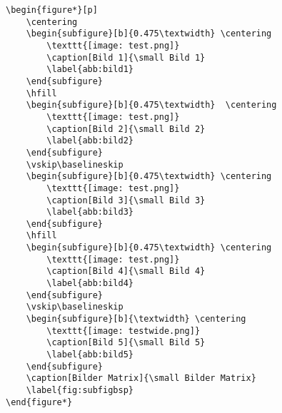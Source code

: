 \clearpage
\begin{lstlisting}[style=latex]
\begin{figure*}[p]
	\centering
	\begin{subfigure}[b]{0.475\textwidth} \centering
		\texttt{[image: test.png]}
		\caption[Bild 1]{\small Bild 1}
		\label{abb:bild1}
	\end{subfigure}
	\hfill
	\begin{subfigure}[b]{0.475\textwidth}  \centering 
		\texttt{[image: test.png]}
		\caption[Bild 2]{\small Bild 2}    
		\label{abb:bild2}
	\end{subfigure}
	\vskip\baselineskip
	\begin{subfigure}[b]{0.475\textwidth} \centering
		\texttt{[image: test.png]}
		\caption[Bild 3]{\small Bild 3}
		\label{abb:bild3}
	\end{subfigure}
	\hfill
	\begin{subfigure}[b]{0.475\textwidth} \centering 
		\texttt{[image: test.png]}
		\caption[Bild 4]{\small Bild 4}    
		\label{abb:bild4}
	\end{subfigure}
	\vskip\baselineskip
	\begin{subfigure}[b]{\textwidth} \centering
		\texttt{[image: testwide.png]}
		\caption[Bild 5]{\small Bild 5}
		\label{abb:bild5}
	\end{subfigure}
	\caption[Bilder Matrix]{\small Bilder Matrix} 
	\label{fig:subfigbsp}
\end{figure*}
\end{lstlisting}



